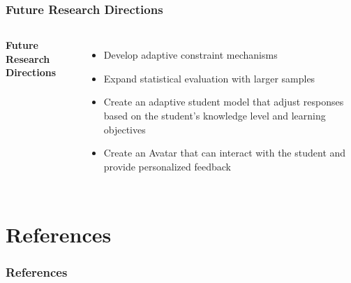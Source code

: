\documentclass{beamer}
\begin{document}
\begin{frame}
\frametitle{Future Research Directions}

\begin{columns}
\textbf{Future Research Directions}
\begin{itemize}
    \item Develop adaptive constraint mechanisms
    \item Expand statistical evaluation with larger samples
    \item Create an adaptive student model that adjust responses based on the student's knowledge level and learning objectives
    \item Create an Avatar that can interact with the student and provide personalized feedback
\end{itemize}
\end{columns}
\end{frame}

\section{References}
\begin{frame}[allowframebreaks]
\frametitle{References}


\nocite{horrocks2024owl}
\nocite{pallets2024quart}
\nocite{rodriguez2024adaptive}
\nocite{scibite2024ontologies}
\nocite{wilson2024educational}
\nocite{chen2024comparing}
\nocite{rivera2024impact}


\end{frame}
\end{document}
